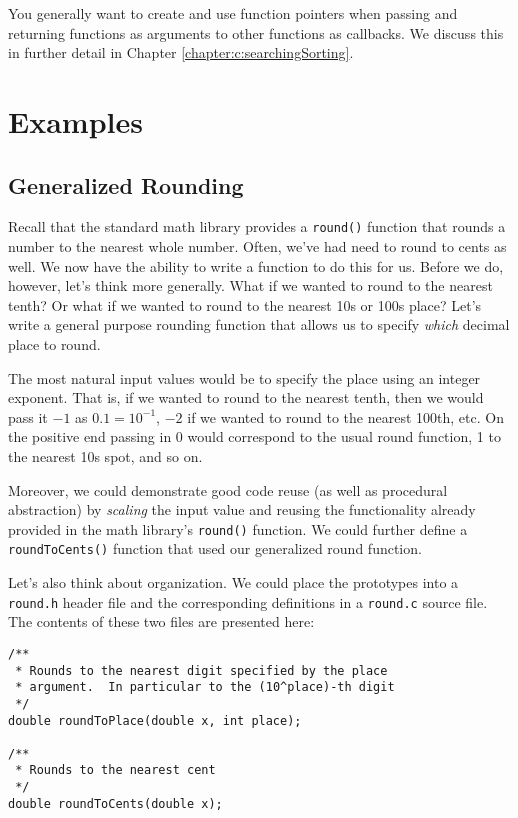You generally want to create and use function pointers when
passing and returning functions as arguments to other
functions as callbacks.  We discuss this in further detail
in Chapter \ref{chapter:c:searchingSorting}.

\section{Examples}

\subsection{Generalized Rounding}

Recall that the standard math library provides a \texttt{round()}
function that rounds a number to the nearest whole number.  Often, we've
had need to round to cents as well.  We now have the ability to write
a function to do this for us.  Before we do, however, let's think more
generally.  What if we wanted to round to the nearest tenth?  Or
what if we wanted to round to the nearest 10s or 100s place?  Let's
write a general purpose rounding function that allows us to specify
\emph{which} decimal place to round.  

The most natural input values would be to specify the place using
an integer exponent.  That is, if we wanted to round to the nearest
tenth, then we would pass it $-1$ as $0.1 = 10^{-1}$, $-2$ if we wanted
to round to the nearest 100th, etc.  On the positive end passing in 0
would correspond to the usual round function, 1 to the nearest 10s spot, 
and so on.  

Moreover, we could demonstrate good code reuse (as well as procedural
abstraction) by \emph{scaling} the input value and reusing the functionality
already provided in the math library's \texttt{round()} function.  We
could further define a \texttt{roundToCents()} function that used 
our generalized round function.

Let's also think about organization.  We could place the prototypes into
a \texttt{round.h} header file and the corresponding definitions
in a \texttt{round.c} source file.  The contents of these two
files are presented here:

\begin{verbatim}
/**
 * Rounds to the nearest digit specified by the place
 * argument.  In particular to the (10^place)-th digit
 */
double roundToPlace(double x, int place);

/**
 * Rounds to the nearest cent
 */
double roundToCents(double x);
\end{verbatim}

